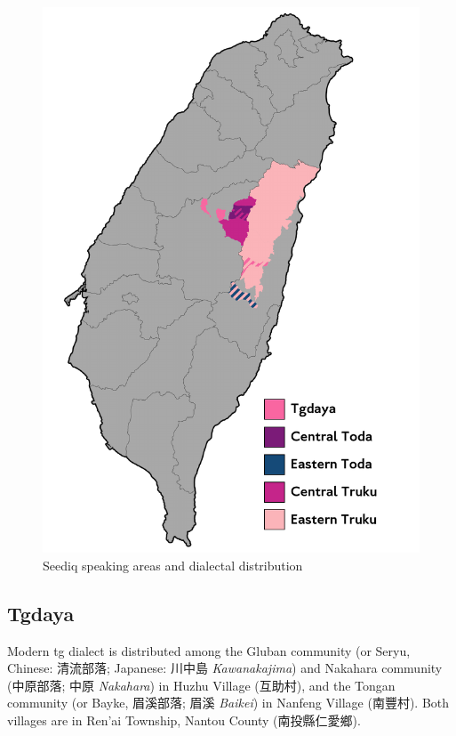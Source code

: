 \begin{figure}
    \centering
    \includegraphics[width=1\linewidth]{img/dialectmap.pdf}
    \caption{Seediq speaking areas and dialectal distribution}
    \label{fig:dialectmap}
\end{figure}

\subsection{Tgdaya} \label{sec:tgintro}

Modern \acl{tg} dialect is distributed among the Gluban community (or Seryu, Chinese: 清流部落; Japanese: 川中島 \textit{Kawanakajima}) and Nakahara community (中原部落; 中原 \textit{Nakahara}) in Huzhu Village (互助村), and the Tongan community (or Bayke, 眉溪部落; 眉溪 \textit{Baikei}) in Nanfeng Village (南豐村). Both villages are in Ren'ai Township, Nantou County (南投縣仁愛鄉). 

